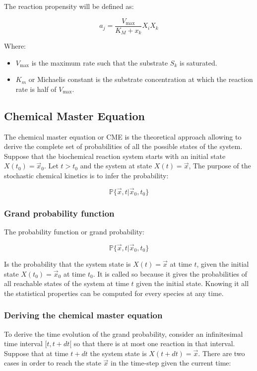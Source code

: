       The reaction propensity will be defined as:

      $$a_j = \frac{V_{\max}}{K_M+x_k}X_iX_k$$

      Where:

      \begin{multicols}{2}
        \begin{itemize}
          \item $V_{\max}$ is the maximum rate such that the substrate $S_k$ is saturated.
          \item  $K_m$  or Michaelis constant is the substrate concentration at which the reaction rate is half of $V_{\max}$.
        \end{itemize}
      \end{multicols}

  \subsection{Chemical Master Equation}
  The chemical master equation or CME is the theoretical approach allowing to derive the complete set of probabilities of all the possible states of the system.
  Suppose that the biochemical reaction system starts with an initial state $X(t_0) = \vec{x}_0$.
  Let $t>t_0$ and the system at state $X(t)=\vec{x}$,
  The purpose of the stochastic chemical kinetics is to infer the probability:

  $$\mathbb{P}\{\vec{x},t|\vec{x}_0, t_0\}$$

    \subsubsection{Grand probability function}
    The probability function or grand probability:

    $$\mathbb{P}\{\vec{x},t|\vec{x}_0,t_0\}$$

    Is the probability that the system state is $X(t) = \vec{x}$ at time $t$, given the initial state $X(t_0) = \vec{x}_0$ at time $t_0$.
    It is called so because it gives the probabilities of all reachable states of the system at time $t$ given the initial state.
    Knowing it all the statistical properties can be computed for every species at any time.

    \subsubsection{Deriving the chemical master equation}
    To derive the time evolution of the grand probability, consider an infinitesimal time interval $[t, t+ dt[$ so that there is at most one reaction in that interval.
    Suppose that at time $t+dt$ the system state is $X(t+dt) = \vec{x}$.
    There are two cases in order to reach the state $\vec{x}$ in the time-step given the current time:

